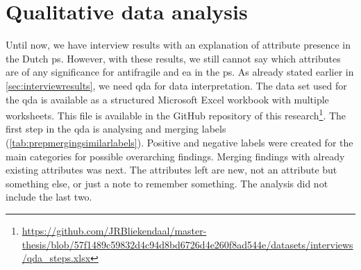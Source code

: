 \section{Qualitative data analysis}
\label{sec:dataprep}
Until now, we have interview results with an explanation of attribute presence in the Dutch \gls{ps}. However, with these results, we still cannot say which attributes are of any significance for \gls{antifragile} and \gls{ea} in the \gls{ps}. As already stated earlier in \cref{sec:interviewresults}, we need \gls{qda} for data interpretation. The data set used for the \gls{qda} is available as a structured Microsoft Excel workbook with multiple worksheets. This file is available in the GitHub repository of this research\footnote{\url{https://github.com/JRBliekendaal/master-thesis/blob/57f1489c59832d4c94d8bd6726d4e260f8ad544e/datasets/interviews/qda_steps.xlsx}}. The first step in the \gls{qda} is analysing and merging labels (\cref{tab:prepmergingsimilarlabels}). Positive and negative labels were created for the main categories for possible overarching findings. Merging findings with already existing \glspl{attribute} was next. The \glspl{attribute} left are new, not an \gls{attribute} but something else, or just a note to remember something. The analysis did not include the last two. 
